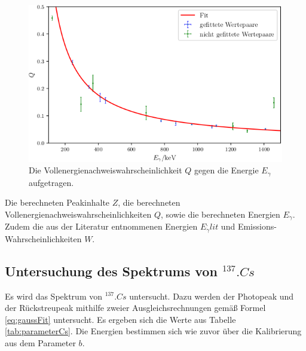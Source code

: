 \begin{figure}
	\centering
	\includegraphics[width=\linewidth-70pt,height=\textheight-70pt,keepaspectratio]{content/images/Q.png}
	\caption{Die Vollenergienachweiswahrscheinlichkeit $Q$ gegen die Energie $E_\gamma$ aufgetragen.}
	\label{fig:Q}
\end{figure}

\begin{table}
	\centering
	\caption{Die berechneten Peakinhalte $Z$, die berechneten Vollenergienachweiswahrscheinlichkeiten $Q$, sowie die berechneten Energien $E_\gamma$. Zudem die aus der Literatur entnommenen Energien $E_\gamma^.{lit}$ und Emissions-Wahrscheinlichkeiten $W$.}
	
	\label{tab:Q}
\end{table}

\subsection{Untersuchung des Spektrums von $^{137}.{Cs}$}

Es wird das Spektrum von $^{137}.{Cs}$ untersucht. Dazu werden der Photopeak und der Rückstreupeak mithilfe zweier Ausgleichsrechnungen gemäß Formel \eqref{eq:gaussFit} untersucht. Es ergeben sich die Werte aus Tabelle \ref{tab:parameterCs}. Die Energien bestimmen sich wie zuvor über die Kalibrierung aus dem Parameter $b$.    

